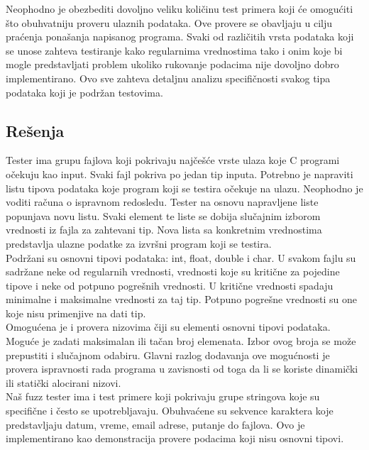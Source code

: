 \documentclass[a4paper]{article}
\begin{document}
{Neophodno je obezbediti dovoljno veliku količinu test primera koji će omogućiti što obuhvatniju proveru ulaznih podataka. Ove provere se obavljaju u cilju praćenja ponašanja napisanog programa. Svaki od različitih vrsta podataka koji se unose zahteva testiranje kako regularnima vrednostima tako i onim koje bi mogle predstavljati problem ukoliko rukovanje podacima nije dovoljno dobro implementirano. Ovo sve zahteva detaljnu analizu specifičnosti svakog tipa podataka koji je podržan testovima.

\subsection{Rešenja}
\label{subsec:resenja_koje_nudi_tester}

Tester ima grupu fajlova koji pokrivaju najčešće vrste ulaza koje C programi očekuju kao input. Svaki fajl pokriva po jedan tip inputa. Potrebno je napraviti listu tipova podataka koje program koji se testira očekuje na ulazu. Neophodno je voditi računa o ispravnom redosledu. Tester na osnovu napravljene liste popunjava novu listu. Svaki element te liste se dobija slučajnim izborom vrednosti iz fajla za zahtevani tip. Nova lista sa konkretnim vrednostima predstavlja ulazne podatke za izvršni program koji se testira. \\

Podržani su osnovni tipovi podataka: int, float, double i char. U svakom fajlu su sadržane neke od regularnih vrednosti, vrednosti koje su kritične za pojedine tipove i neke od potpuno pogrešnih vrednosti. U kritične vrednosti spadaju minimalne i maksimalne vrednosti za taj tip. Potpuno pogrešne vrednosti su one koje nisu primenjive na dati tip. \\

Omogućena je i provera nizovima čiji su elementi osnovni tipovi podataka. Moguće je zadati maksimalan ili tačan broj elemenata. Izbor ovog broja se može prepustiti i slučajnom odabiru. Glavni razlog dodavanja ove mogućnosti je provera ispravnosti rada programa u zavisnosti od toga da li se koriste dinamički ili statički alocirani nizovi. \\

Naš fuzz tester ima i test primere koji pokrivaju grupe stringova koje su specifične i često se upotrebljavaju. Obuhvaćene su sekvence karaktera koje predstavljaju datum, vreme, email adrese, putanje do fajlova. Ovo je implementirano kao demonstracija provere podacima koji nisu osnovni tipovi. \\
 
}
\end{document}
